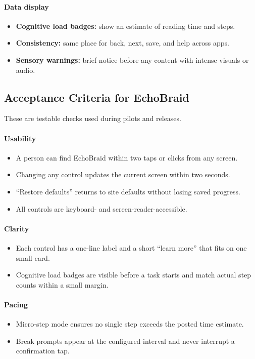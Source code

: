 \documentclass[12pt]{article}
\begin{document}
\paragraph{Data display}
\begin{itemize}[leftmargin=*]
  \item \textbf{Cognitive load badges:} show an estimate of reading time and steps.
  \item \textbf{Consistency:} same place for back, next, save, and help across apps.
  \item \textbf{Sensory warnings:} brief notice before any content with intense visuals or audio.
\end{itemize}

\subsection*{Acceptance Criteria for EchoBraid}
These are testable checks used during pilots and releases.

\paragraph{Usability}
\begin{itemize}[leftmargin=*]
  \item A person can find EchoBraid within two taps or clicks from any screen.
  \item Changing any control updates the current screen within two seconds.
  \item “Restore defaults” returns to site defaults without losing saved progress.
  \item All controls are keyboard- and screen-reader-accessible.
\end{itemize}

\paragraph{Clarity}
\begin{itemize}[leftmargin=*]
  \item Each control has a one-line label and a short “learn more” that fits on one small card.
  \item Cognitive load badges are visible before a task starts and match actual step counts within a small margin.
\end{itemize}

\paragraph{Pacing}
\begin{itemize}[leftmargin=*]
  \item Micro-step mode ensures no single step exceeds the posted time estimate.
  \item Break prompts appear at the configured interval and never interrupt a confirmation tap.
\end{itemize}
\end{document}
